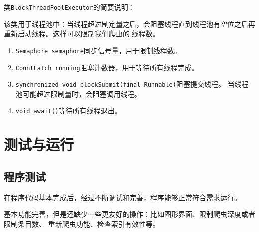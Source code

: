 \documentclass[UTF8,a4paper,12pt]{ctexart}
\begin{document}
类\texttt{BlockThreadPoolExecutor}的简要说明：\par
该类用于线程池中：当线程超过制定量之后，会阻塞线程直到线程池有空位之后再重新启动线程。这样可以限制我们爬虫的
线程数。
\begin{enumerate}[label=(\arabic*), wide=2em]
\item \texttt{Semaphore semaphore}同步信号量，用于限制线程数。
\item \texttt{CountLatch running}阻塞计数器，用于等待所有线程完成。
\item \texttt{synchronized void blockSubmit(final Runnable)}阻塞提交线程。
当线程池可能超过限制量时，会阻塞调用线程。
\item \texttt{void await()}等待所有线程退出。
\end{enumerate}
\section{测试与运行}
\subsection{程序测试}
在程序代码基本完成后，经过不断调试和完善，程序能够正常符合需求运行。\par
基本功能完善，但是还缺少一些更友好的操作：比如图形界面、限制爬虫深度或者限制条目数、
重新爬虫功能、检查索引有效性等。
\end{document}
